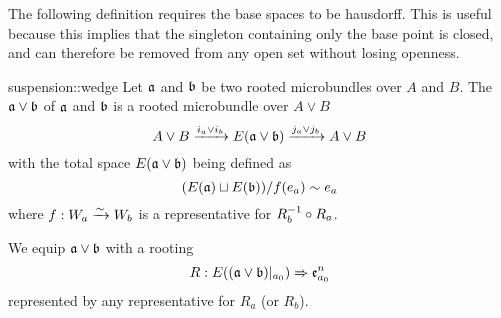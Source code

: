 \begin{myparagraph}
    The following definition requires the base spaces to be hausdorff.
    This is useful because this implies that the singleton containing only the base point is closed,
    and can therefore be removed from any open set without losing openness.  
\end{myparagraph}

\begin{mydefinition}{suspension::wedge}
    Let $\mathfrak{a}$ and $\mathfrak{b}$ be two rooted microbundles over $A$ and $B$.
    The  $\mathfrak{a} \vee \mathfrak{b}$ of $\mathfrak{a}$ and $\mathfrak{b}$ is a rooted microbundle over $A \vee B$
    \[ A \vee B \xrightarrow{i_a \vee i_b} E(\mathfrak{a} \vee \mathfrak{b}) \xrightarrow{j_a \vee j_b} A \vee B \]
    with the total space $E(\mathfrak{a} \vee \mathfrak{b})$ being defined as
    \[ (E(\mathfrak{a}) \sqcup E(\mathfrak{b})) / f(e_a) \sim e_a \]
    where $f: W_a \xrightarrow{\sim} W_b$ is a representative for $R_b^{-1} \circ R_a$.
    
    We equip $\mathfrak{a} \vee \mathfrak{b}$ with a rooting
    \[ R: E((\mathfrak{a} \vee \mathfrak{b})\vert_{a_0}) \Rightarrow{} \mathfrak{e}^{n}_{a_0} \]
    represented by any representative for $R_a$ (or $R_b$).
\end{mydefinition}

